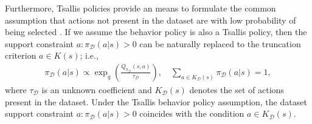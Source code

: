 \documentclass{article}
\newcommand{\AdaBracket}[1]{\left(#1\right)}
\newcommand{\AdaRectBracket}[1]{\left[#1\right]}
\newcommand{\expectation}[2]{\mathbb{E}_{#1}\AdaRectBracket{#2}}
\newcommand{\datasetPolicy}{\pi_{\mathcal{D}}}
\begin{document}
Furthermore, Tsallis policies provide an means to formulate the common assumption that actions not present in the dataset are with low probability of being selected \cite{Kostrikov2021-fisherCriticReg}.
If we assume the behavior policy is also a Tsallis policy, then the support constraint $a:\datasetPolicy(a|s)>0$ can be naturally replaced to the truncation criterion $a\in K(s)$; i.e.,
\begin{align}
    \datasetPolicy(a|s) \propto \exp_q\AdaBracket{\frac{Q_{\datasetPolicy}(s,a)}{\tau_\mathcal{D}}},  \quad \sum_{a\in K_\mathcal{D}(s)} \pi_\mathcal{D}(a|s)= 1,
\end{align}
where $\tau_\mathcal{D}$ is an unknown coefficient and $K_\mathcal{D}(s)$ denotes the set of actions present in the dataset.
Under the Tsallis behavior policy assumption, the dataset support constraint $a: \datasetPolicy(a|s) > 0$ coincides with the condition $a \in K_{\mathcal{D}}(s)$.
\end{document}
